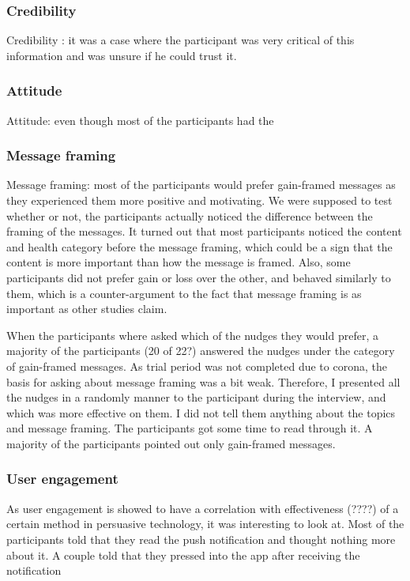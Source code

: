 \subsubsection{Credibility}
Credibility : it was a case where the participant was very critical of this information and was unsure if he could trust it.

\subsubsection{Attitude}
Attitude: even though most of the participants had the 

\subsubsection{Message framing}
Message framing: most of the participants would prefer gain-framed messages as they experienced them more positive and motivating. 
We were supposed to test whether or not, the participants actually noticed the difference between the framing of the messages. It turned out that most participants noticed the content and health category before the message framing, which could be a sign that the content is more important than how the message is framed. Also, some participants did not prefer gain or loss over the other, and behaved similarly to them, which is a counter-argument to the fact that message framing is as important as other studies claim.

When the participants where asked which of the nudges they would prefer, a majority of the participants (20 of 22?) answered the nudges under the category of gain-framed messages. 
As trial period was not completed due to corona, the basis for asking about message framing was a bit weak. Therefore, I presented all the nudges in a randomly manner to the participant during the interview, and which was more effective on them. I did not tell them anything about the topics and message framing. The participants got some time to read through it. A majority of the participants pointed out only gain-framed messages.  

\subsubsection{User engagement}
 As user engagement is showed to have a correlation with effectiveness (????) of a certain method in persuasive technology, it was interesting to look at. Most of the participants told that they read the push notification and thought nothing more about it. A couple told that they pressed into the app after receiving the notification
 
